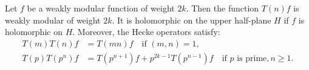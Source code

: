 Let $f$ be a weakly modular function of weight $2k$. Then the function $T(n)f$ is weakly modular of weight $2k$. It is holomorphic on the upper half-plane $H$ if $f$ is holomorphic on $H$. Moreover, the Hecke operators satisfy:
\begin{align*}
T(m)T(n)f &= T(mn)f \quad \text{if } (m, n) = 1,\\
T(p)T(p^n)f &= T(p^{n+1})f + p^{2k-1}T(p^{n-1})f \quad \text{if } p \text{ is prime}, n \geq 1.
\end{align*}
